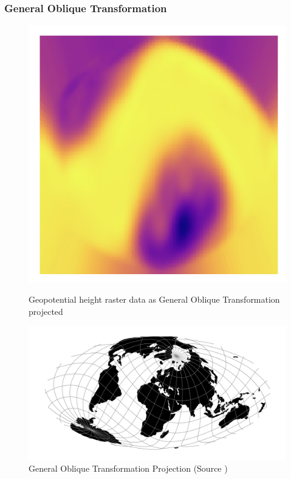 \subsubsection*{General Oblique Transformation}
\begin{figure}[h]
    \centering
    \begin{minipage}{0.30\textwidth}
        \centering
        \includegraphics[width=0.9\linewidth]{figures/chapter-8/geopoth_got.png}
        \caption{ Geopotential height raster data as General Oblique Transformation projected}
        \label{fig:ob_tran_geopoth_raster}
    \end{minipage}\hfill
    \begin{minipage}{0.30\textwidth}
        \centering
        \includegraphics[width=0.9\linewidth]{figures/chapter-8/ob_tran.png}
        \caption{General Oblique Transformation Projection (Source \cite{PROJ_SITE})}

\end{minipage}
\end{figure}
